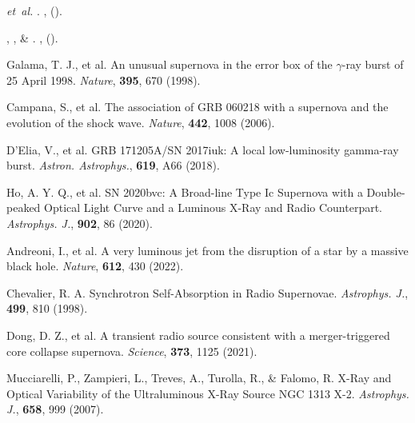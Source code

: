 \documentclass{nature_plusfigure}
\newcommand{\apj}{{Astrophys. J.}}
\newcommand{\aap}{{Astron. Astrophys.}}
\newcommand{\nat}{{Nature}}
\begin{document}
\begin{thebibliography}{100}
 \emph{et~al.}
\newblock {}.
\newblock \emph{} \textbf{},
   ().

, ,
   \& 
\newblock {}.
\newblock \emph{\bibinfo{journal}{\apj}} \textbf{},
   ().

 Galama, T. J., et al. An unusual supernova in the error box of the $\gamma$-ray burst of 25 April 1998. \emph{\nat}, \textbf{395}, 670 (1998). 

 Campana, S., et al. The association of GRB 060218 with a supernova and the evolution of the shock wave. \emph{\nat}, \textbf{442}, 1008 (2006). 

 D'Elia, V., et al. GRB 171205A/SN 2017iuk: A local low-luminosity gamma-ray burst. \emph{\aap}, \textbf{619}, A66 (2018). 

 Ho, A. Y. Q., et al. SN 2020bvc: A Broad-line Type Ic Supernova with a Double-peaked Optical Light Curve and a Luminous X-Ray and Radio Counterpart. \emph{\apj}, \textbf{902}, 86 (2020). 

 Andreoni, I., et al. A very luminous jet from the disruption of a star by a massive black hole. \emph{\nat}, \textbf{612}, 430 (2022). 

 
  Chevalier, R. A. Synchrotron Self-Absorption in Radio Supernovae. \emph{\apj}, \textbf{499}, 810 (1998). 
 
   Dong, D. Z., et al. A transient radio source consistent with a merger-triggered core collapse supernova. \emph{Science}, \textbf{373}, 1125 (2021). 
  
 
 Mucciarelli, P., Zampieri, L., Treves, A., Turolla, R., \& Falomo, R. X-Ray and Optical Variability of the Ultraluminous X-Ray Source NGC 1313 X-2. \emph{\apj}, \textbf{658}, 999 (2007). 


\end{thebibliography}
\end{document}
